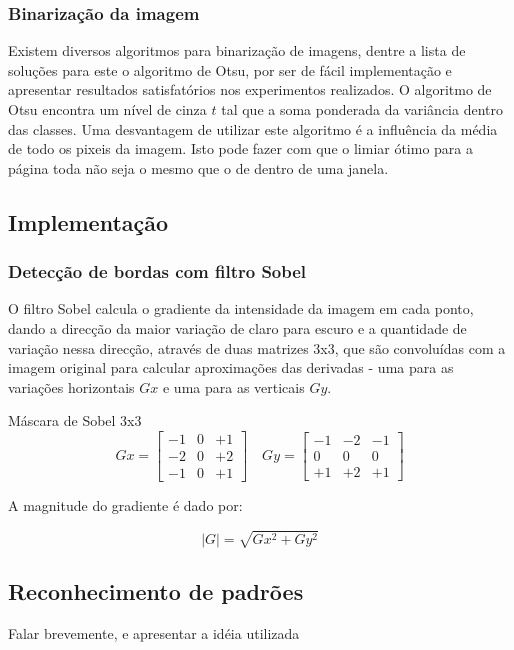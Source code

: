 \documentclass[12pt]{article}
\begin{document}
\subsubsection{Binarização da imagem}

Existem diversos algoritmos para binarização de imagens, dentre a lista de soluções para este  o algoritmo de Otsu, por ser de fácil implementação e apresentar resultados satisfatórios nos experimentos realizados. O algoritmo de Otsu encontra um nível de cinza $t$ tal que a soma ponderada da variância dentro das classes.
Uma desvantagem de utilizar este algoritmo é a influência da média de todo os pixeis da imagem. Isto pode fazer com que o limiar ótimo para a página toda não seja o mesmo que o de dentro de uma janela.

    \subsection{Implementação}



\subsubsection{Detecção de bordas com filtro Sobel}

O filtro Sobel calcula o gradiente da intensidade da imagem em cada ponto, dando a direcção da maior variação de claro para escuro e a quantidade de variação nessa direcção, através de duas matrizes 3x3, que são convoluídas com a imagem original para calcular aproximações das derivadas - uma para as variações horizontais $Gx$ e uma para as verticais $Gy$.
\begin{center}{Máscara de Sobel 3x3}
$$
Gx=\left[\begin{array}{rrr}
-1&0&+1\\
-2&0&+2 \\
-1&0&+1
\end{array}\right]\quad
Gy=\left[\begin{array}{ccc}
-1&-2&-1\\
0& 0& 0 \\
+1&+2&+1
\end{array}\right]
$$
\end{center}
A magnitude do gradiente é dado por:

$$
|G|=\sqrt{Gx^2 + Gy^2}
$$	



\subsection{Reconhecimento de padrões}
Falar brevemente, e apresentar a idéia utilizada
\end{document}
